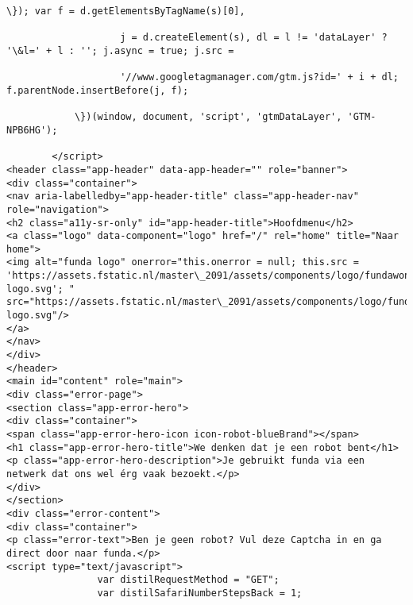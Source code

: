 \documentclass[11pt]{article}
\begin{document}
\begin{Verbatim}[commandchars=\\\{\}]
                \}); var f = d.getElementsByTagName(s)[0],

                    j = d.createElement(s), dl = l != 'dataLayer' ? '\&l=' + l : ''; j.async = true; j.src =

                    '//www.googletagmanager.com/gtm.js?id=' + i + dl; f.parentNode.insertBefore(j, f);

            \})(window, document, 'script', 'gtmDataLayer', 'GTM-NPB6HG');

        </script>
<header class="app-header" data-app-header="" role="banner">
<div class="container">
<nav aria-labelledby="app-header-title" class="app-header-nav" role="navigation">
<h2 class="a11y-sr-only" id="app-header-title">Hoofdmenu</h2>
<a class="logo" data-component="logo" href="/" rel="home" title="Naar home">
<img alt="funda logo" onerror="this.onerror = null; this.src = 'https://assets.fstatic.nl/master\_2091/assets/components/logo/fundawonen-logo.svg'; " src="https://assets.fstatic.nl/master\_2091/assets/components/logo/fundawonen-logo.svg"/>
</a>
</nav>
</div>
</header>
<main id="content" role="main">
<div class="error-page">
<section class="app-error-hero">
<div class="container">
<span class="app-error-hero-icon icon-robot-blueBrand"></span>
<h1 class="app-error-hero-title">We denken dat je een robot bent</h1>
<p class="app-error-hero-description">Je gebruikt funda via een netwerk dat ons wel érg vaak bezoekt.</p>
</div>
</section>
<div class="error-content">
<div class="container">
<p class="error-text">Ben je geen robot? Vul deze Captcha in en ga direct door naar funda.</p>
<script type="text/javascript">
                var distilRequestMethod = "GET";
                var distilSafariNumberStepsBack = 1;


\end{Verbatim}
\end{document}
